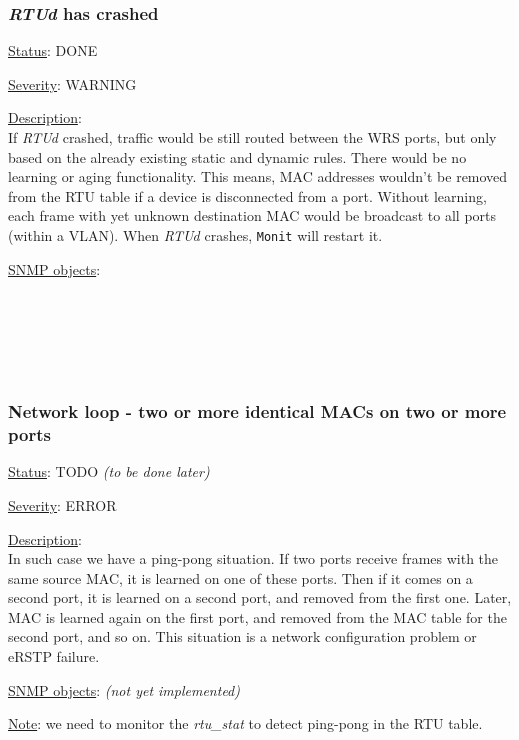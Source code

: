 \subsubsection{\bf \emph{RTUd} has crashed}
		\label{fail:data:rtu_crash}
		\begin{pck_descr}
			\item [] \underline{Status}: DONE
			\item [] \underline{Severity}: WARNING
			\item [] \underline{Description}:\\
				If \emph{RTUd} crashed, traffic would be still routed between the WRS ports, but
				only based on the already existing static and dynamic rules. There would be
				no learning or aging functionality. This means, MAC addresses wouldn't be
				removed from the RTU table if a device is disconnected from a port.
				Without learning, each frame with yet unknown destination MAC would be
				broadcast to all ports (within a VLAN). When \emph{RTUd} crashes,
				\texttt{Monit} will restart it.
			\item [] \underline{SNMP objects}:\\
				\\
				\\
				\\
				\\
				\\
		\end{pck_descr}

\subsubsection{\bf Network loop - two or more identical MACs on two or more ports}
		\label{fail:data:net_loop}
		\begin{pck_descr}
			\item [] \underline{Status}: TODO \emph{(to be done later)}
			\item [] \underline{Severity}: ERROR
			\item [] \underline{Description}:\\
				In such case we have a ping-pong situation. If two ports receive frames
				with the same source MAC, it is learned on one of these ports. Then if
				it comes on a second port, it is learned on a second port, and removed
				from the first one. Later, MAC is learned again on the first port, and
				removed from the MAC table for the second port, and so on. This
				situation is a network configuration problem or eRSTP failure.
			\item [] \underline{SNMP objects}: \emph{(not yet implemented)}
			\item [] \underline{Note}: we need to monitor the \emph{rtu\_stat} to
				detect ping-pong in the RTU table.
		\end{pck_descr}

